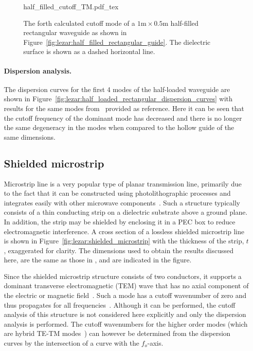\begin{figure}
\bwfig
\centering
  \def\svgwidth{\smallfig}
    {half_filled_cutoff_TM.pdf_tex}
\caption{The forth calculated cutoff mode of a
$1\text{m}\times0.5\text{m}$ half-filled rectangular waveguide as shown
in Figure~\ref{fig:lezar:half_filled_rectangular_guide}. The dielectric
surface is shown as a dashed horizontal line.}
\label{fig:lezar:half_filled_rectangular_cutoff_TM}
\end{figure}

\paragraph{Dispersion analysis.}

The dispersion curves for the first 4
modes of the half-loaded waveguide are shown in
Figure~\ref{fig:lezar:half_loaded_rectangular_dispersion_curves}
with results for the same modes from~\citet{Jin2002} provided as
reference. Here it can be seen that the cutoff frequency of the dominant
mode has decreased and there is no longer the same degeneracy in the
modes when compared to the hollow guide of the same dimensions.

\enlargethispage{12pt}

\subsection{Shielded microstrip}
\label{lezar:sec:shielded_microstrip}

Microstrip line is a very popular type of planar transmission
line, primarily due to the fact that it can be constructed using
photolithographic processes and integrates easily with other microwave
components~\citep{Pozar2005}. Such a structure typically consists of a
thin conducting strip on a dielectric substrate above a ground plane. In
addition, the strip may be shielded by enclosing it in a PEC box to reduce
electromagnetic interference. A cross section of a lossless shielded
microstrip line is shown in Figure~\ref{fig:lezar:shielded_microstrip}
with the thickness of the strip, $t$, exaggerated for clarity. The
dimensions used to obtain the results discussed here, are the same as
those in \citet{PelosiCoccioliSelleri1998}, and are indicated in the figure.

Since the shielded microstrip structure consists of two
conductors, it supports a dominant transverse electromagnetic
(TEM) wave that has no axial component of the electric or
magnetic field~\citep{Pozar2005}. Such a mode has a cutoff
wavenumber of zero and thus propagates for all
frequencies~\citep{Jin2002,PelosiCoccioliSelleri1998}. Although it can
be performed, the cutoff analysis of this structure is not considered
here explicitly and only the dispersion analysis is performed. The
cutoff wavenumbers for the higher order modes (which are hybrid TE-TM
modes~\citep{Pozar2005}) can however be determined from the dispersion
curves by the intersection of a curve with the $f_o$-axis.\pagebreak

